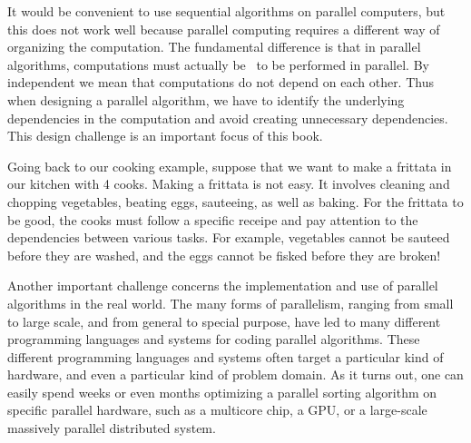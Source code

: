 \begin{cluster}
\label{grp:gr:intro::intro::parallelism::challenges}

\begin{gram}
\label{gr:intro::intro::parallelism::challenges}
It would be convenient to use sequential algorithms on parallel
computers, but this does not work well because parallel computing
requires a different way of organizing the computation.
The fundamental difference is that in parallel algorithms,
computations must actually be~ to be performed in
parallel.
By independent we mean that computations do not depend on each other.
Thus when designing a parallel algorithm, we have to identify the
underlying dependencies in the computation and avoid creating
unnecessary dependencies.
This design challenge is an important focus of this book.

\end{gram}
\end{cluster}

\begin{cluster}
\label{grp:xmpl:introduction::parallelism::going}

\begin{example}
\label{xmpl:introduction::parallelism::going}
Going back to our cooking example, suppose that we want to make a
frittata in our kitchen with 4 cooks.
Making a frittata is not easy.
It involves cleaning and chopping vegetables, beating eggs,
sauteeing, as well as baking.
For the frittata to be good, the cooks must follow a specific receipe
and pay attention to the dependencies between various tasks.
For example,
vegetables cannot be sauteed before they are washed, and 
the eggs cannot be fisked before they are broken!

\end{example}
\end{cluster}

\begin{cluster}
\label{grp:gr:intro::intro::parallelism::challenges-software}

\begin{gram}
\label{gr:intro::intro::parallelism::challenges-software}
Another important challenge concerns the implementation and use of
parallel algorithms in the real world.
The many forms of parallelism, ranging from small to large scale, and
from general to special purpose, have led to many different programming
languages and systems for coding parallel algorithms.
These different programming languages and systems often target a
particular kind of hardware, and even a particular kind of problem
domain.  
As it turns out, one can easily spend weeks or even months optimizing a
parallel sorting algorithm on specific parallel hardware, such as a
multicore chip, a GPU, or a large-scale massively parallel distributed
system.

\end{gram}
\end{cluster}

